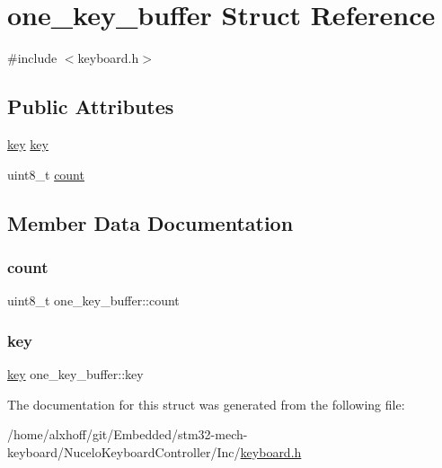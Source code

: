 \hypertarget{structone__key__buffer}{}\section{one\+\_\+key\+\_\+buffer Struct Reference}
\label{structone__key__buffer}


{\ttfamily \#include $<$keyboard.\+h$>$}

\subsection*{Public Attributes}
\begin{DoxyCompactItemize}
\item 
\hyperlink{structkey}{key} \hyperlink{structone__key__buffer_af885b8095d8ec9302aa9a554b6f2f132}{key}
\item 
uint8\+\_\+t \hyperlink{structone__key__buffer_af56652a957a49467fb8aa65a5e03f372}{count}
\end{DoxyCompactItemize}


\subsection{Member Data Documentation}
\mbox{\label{structone__key__buffer_af56652a957a49467fb8aa65a5e03f372}} 
\subsubsection{\texorpdfstring{count}{count}}
{\footnotesize\ttfamily uint8\+\_\+t one\+\_\+key\+\_\+buffer\+::count}

\mbox{\label{structone__key__buffer_af885b8095d8ec9302aa9a554b6f2f132}} 
\subsubsection{\texorpdfstring{key}{key}}
{\footnotesize\ttfamily \hyperlink{structkey}{key} one\+\_\+key\+\_\+buffer\+::key}



The documentation for this struct was generated from the following file\+:\begin{DoxyCompactItemize}
\item 
/home/alxhoff/git/\+Embedded/stm32-\/mech-\/keyboard/\+Nucelo\+Keyboard\+Controller/\+Inc/\hyperlink{keyboard_8h}{keyboard.\+h}\end{DoxyCompactItemize}
